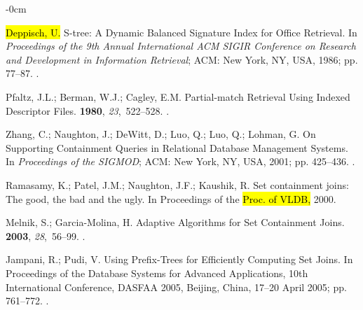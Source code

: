 \documentclass[algorithms,article,accept,pdftex,moreauthors]{Definitions/mdpi}
\begin{document}
\begin{adjustwidth}{-\extralength}{0cm}
\begin{thebibliography}{999}
\hl{Deppisch, U.} %
\newblock S-tree: A Dynamic Balanced Signature Index for Office Retrieval.
\newblock In \emph{Proceedings of the 9th Annual International ACM
  SIGIR Conference on Research and Development in Information Retrieval}; ACM:
  New York, NY, USA,  1986;  pp. 77--87.
.

Pfaltz, J.L.; Berman, W.J.; Cagley, E.M.
\newblock Partial-match Retrieval Using Indexed Descriptor Files.
 {\bf 1980}, {\em 23},~522--528.
.

Zhang, C.; Naughton, J.; DeWitt, D.; Luo, Q.; Luo, Q.; Lohman, G.
\newblock On Supporting Containment Queries in Relational Database Management
  Systems.
\newblock In \emph{Proceedings of the  SIGMOD}; ACM: New York, NY, USA,
  2001; pp. 425--436.
.

Ramasamy, K.; Patel, J.M.; Naughton, J.F.; Kaushik, R.
\newblock Set containment joins: The good, the bad and the ugly.
\newblock In Proceedings of the \hl{Proc. of VLDB,} %
  2000.

Melnik, S.; Garcia-Molina, H.
\newblock Adaptive Algorithms for Set Containment Joins.
 {\bf 2003}, {\em 28},~56--99.
.

Jampani, R.; Pudi, V.
\newblock Using Prefix-Trees for Efficiently Computing Set Joins.
\newblock In Proceedings of the Database Systems for Advanced Applications,
  10th International Conference, {DASFAA} 2005, Beijing, China,  17--20 April
  2005; pp. 761--772.
.


\end{thebibliography}
\end{adjustwidth}
\end{document}
